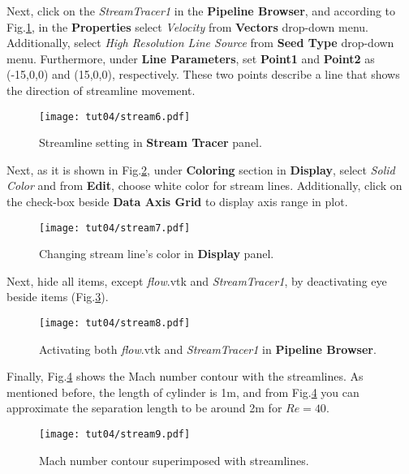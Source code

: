 Next, click on the \textit{StreamTracer1} in the \textbf{Pipeline Browser}, and according to Fig.\ref{fig4:stream6_4}, in the \textbf{Properties} select \textit{Velocity} from \textbf{Vectors} drop-down menu. Additionally, select \textit{High Resolution Line Source} from \textbf{Seed Type} drop-down menu. Furthermore, under \textbf{Line Parameters}, set \textbf{Point1} and \textbf{Point2} as (-15,0,0) and (15,0,0), respectively. These two points describe a line that shows the direction of streamline movement.  
\begin{figure}[htbp]
    \centering
    \texttt{[image: tut04/stream6.pdf]}
    \caption{Streamline setting in \textbf{Stream Tracer} panel.}
    \label{fig4:stream6_4}
\end{figure}
Next, as it is shown in Fig.\ref{fig4:stream7_4}, under \textbf{Coloring} section in \textbf{Display}, select \textit{Solid Color} and from \textbf{Edit}, choose white color for stream lines. Additionally, click on the check-box beside \textbf{Data Axis Grid} to display axis range in plot.
\begin{figure}[htbp]
    \centering
    \texttt{[image: tut04/stream7.pdf]}
    \caption{Changing stream line's color in \textbf{Display} panel.}
    \label{fig4:stream7_4}
\end{figure}
Next, hide all items, except \textit{flow}.vtk and \textit{StreamTracer1}, by deactivating eye beside items (Fig.\ref{fig4:stream8_4}).
\begin{figure}[htbp]
    \centering
    \texttt{[image: tut04/stream8.pdf]}
    \caption{Activating both \textit{flow}.vtk and \textit{StreamTracer1} in \textbf{Pipeline Browser}.}
    \label{fig4:stream8_4}
\end{figure}
Finally, Fig.\ref{fig4:stream9_4} shows the Mach number contour with the streamlines. As mentioned before, the length of cylinder is 1m, and from Fig.\ref{fig4:stream9_4} you can approximate the separation length to be around 2m for $Re=40$.
\begin{figure}[htbp]
    \centering
    \texttt{[image: tut04/stream9.pdf]}
    \caption{Mach number contour superimposed with streamlines.}
    \label{fig4:stream9_4}
\end{figure}

